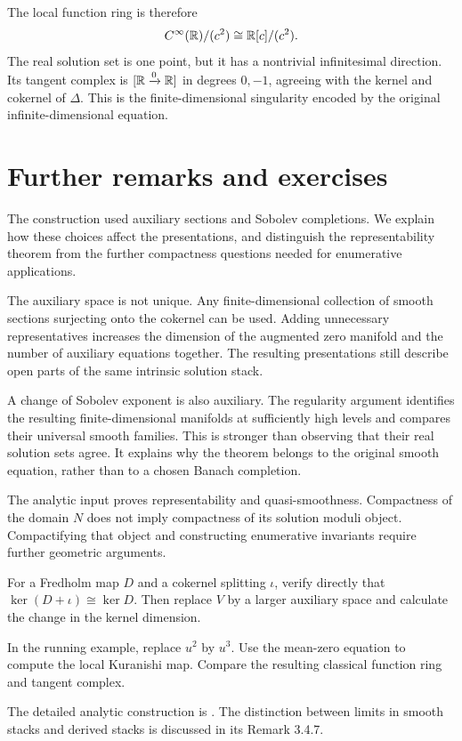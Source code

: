 The local function ring is therefore
\[
 C^\infty(\mathbb{R})/(c^2)\cong\mathbb{R}[c]/(c^2).
\]
The real solution set is one point, but it has a nontrivial infinitesimal
direction. Its tangent complex is $[\mathbb{R}\xrightarrow0\mathbb{R}]$ in degrees
$0,-1$, agreeing with the kernel and cokernel of $\Delta$.
This is the finite-dimensional singularity encoded by the original
infinite-dimensional equation.

\section{Further remarks and exercises}

The construction used auxiliary sections and Sobolev completions.
We explain how these choices affect the presentations, and distinguish
the representability theorem from the further compactness questions
needed for enumerative applications.

The auxiliary space is not unique. Any finite-dimensional collection
of smooth sections surjecting onto the cokernel can be used.
Adding unnecessary representatives increases the dimension of the
augmented zero manifold and the number of auxiliary equations together.
The resulting presentations still describe open parts of the same
intrinsic solution stack.

A change of Sobolev exponent is also auxiliary. The regularity argument
identifies the resulting finite-dimensional manifolds at sufficiently
high levels and compares their universal smooth families.
This is stronger than observing that their real solution sets agree.
It explains why the theorem belongs to the original smooth equation,
rather than to a chosen Banach completion.

The analytic input proves representability and quasi-smoothness.
Compactness of the domain $N$ does not imply compactness of its
solution moduli object. Compactifying that object and constructing
enumerative invariants require further geometric arguments.

\begin{exercise}
For a Fredholm map $D$ and a cokernel splitting $\iota$, verify directly
that $\ker(D+\iota)\cong\ker D$.
Then replace $V$ by a larger auxiliary space and calculate the change
in the kernel dimension.
\end{exercise}

\begin{exercise}
In the running example, replace $u^2$ by $u^3$.
Use the mean-zero equation to compute the local Kuranishi map.
Compare the resulting classical function ring and tangent complex.
\end{exercise}

The detailed analytic construction is
\cite[Lemmas~3.4.5--3.4.6 and the proof of Theorem~3.4.3,
pp.~67--70]{Steffens_Representability_Elliptic_Moduli}.
The distinction between limits in smooth stacks and derived stacks
is discussed in its Remark 3.4.7.
